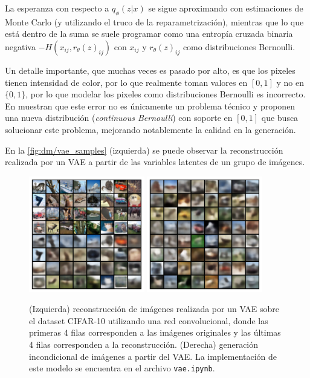 La esperanza con respecto a $q_\phi(z|x)$ se sigue aproximando con estimaciones de Monte Carlo (y utilizando el truco de la reparametrización), mientras que lo que está dentro de la suma se suele programar como una entropía cruzada binaria negativa $-H(x_{ij},r_\theta(z)_{ij})$ con $x_{ij}$ y $r_\theta(z)_{ij}$ como distribuciones Bernoulli.

Un detalle importante, que muchas veces es pasado por alto, es que los pixeles tienen intensidad de color, por lo que realmente toman valores en $[0,1]$ y no en $\{0,1\}$, por lo que modelar los pixeles como distribuciones Bernoulli es incorrecto. En \cite{loaizaganem2019continuous} muestran que este error no es únicamente un problema técnico y proponen una nueva distribución (\textit{continuous Bernoulli}) con soporte en $[0,1]$ que busca solucionar este problema, mejorando notablemente la calidad en la generación.

En la \autoref{fig:dm/vae_samples} (izquierda) se puede observar la reconstrucción realizada por un VAE a partir de las variables latentes de un grupo de imágenes.

\begin{figure}
    \centering
    \includegraphics[width=0.45\textwidth]{images/dm/vae_reconstruction}
    \includegraphics[width=0.45\textwidth]{images/dm/vae_samples}
    \caption{(Izquierda) reconstrucción de imágenes realizada por un VAE sobre el dataset CIFAR-10 utilizando una red convolucional, donde las primeras 4 filas corresponden a las imágenes originales y las últimas 4 filas corresponden a la reconstrucción. (Derecha) generación incondicional de imágenes a partir del VAE. La implementación de este modelo se encuentra en el archivo \texttt{vae.ipynb}.}
    \label{fig:dm/vae_samples}
\end{figure}

